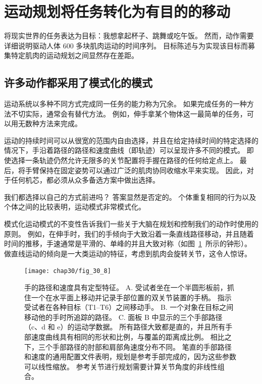 \section{运动规划将任务转化为有目的的移动}

将现实世界的任务表达为目标：我想拿起杯子、跳舞或吃午饭。
然而，动作需要详细说明驱动人体 600 多块肌肉运动的时间序列。
目标陈述与为实现该目标而募集特定肌肉的运动规划之间显然存在差距。



\subsection{许多动作都采用了模式化的模式}

运动系统以多种不同方式完成同一任务的能力称为冗余。
如果完成任务的一种方法不切实际，通常会有替代方法。
例如，伸手拿某个物体这一最简单的任务，可以用无数种方法来完成。


运动的持续时间可以从很宽的范围内自由选择，并且在给定持续时间的特定选择的情况下，手沿着路径的路径和速度曲线（即轨迹）可以呈现许多不同的模式。
即使选择一条轨迹仍然允许无限多的关节配置将手握在路径的任何给定点上。
最后，将手臂保持在固定姿势可以通过广泛的肌肉协同收缩水平来实现。
因此，对于任何机芯，都必须从众多备选方案中做出选择。


我们都选择以自己的方式前进吗？
答案显然是否定的。
个体重复相同的行为以及个体之间的比较表明，运动模式非常模式化。


模式化运动模式的不变性告诉我们一些关于大脑在规划和控制我们的动作时使用的原则。
例如，在伸手时，我们的手倾向于大致沿着一条直线路径移动，并且随着时间的推移，手速通常是平滑的、单峰的并且大致对称（如图~\ref{fig:30_8}~所示的钟形）。
做直线运动的倾向是一大类运动的特征，考虑到肌肉会旋转关节，这令人惊讶。


\begin{figure}[htbp]
	\centering
	\texttt{[image: chap30/fig\_30\_8]}
	\caption{手的路径和速度具有定型特征\cite{morasso1981spatial}。
		A. 受试者坐在一个半圆形板前，抓住一个在水平面上移动并记录手部位置的双关节装置的手柄。
		指示受试者在各种目标（T1–T6）之间移动手。
		B. 一个对象在目标之间移动他的手时所追踪的路径。
		C. 面板 B 中显示的三个手部路径（c、d 和 e）的运动学数据。
		所有路径大致都是直的，并且所有手部速度曲线具有相同的形状和比例，与覆盖的距离成比例。
		相比之下，三个手部路径的肘部和肩部角速度分布不同。
		笔直的手部路径和速度的通用配置文件表明，规划是参考手部完成的，因为这些参数可以线性缩放。
		参考关节进行规划需要计算关节角度的非线性组合。}
	\label{fig:30_8}
\end{figure}


